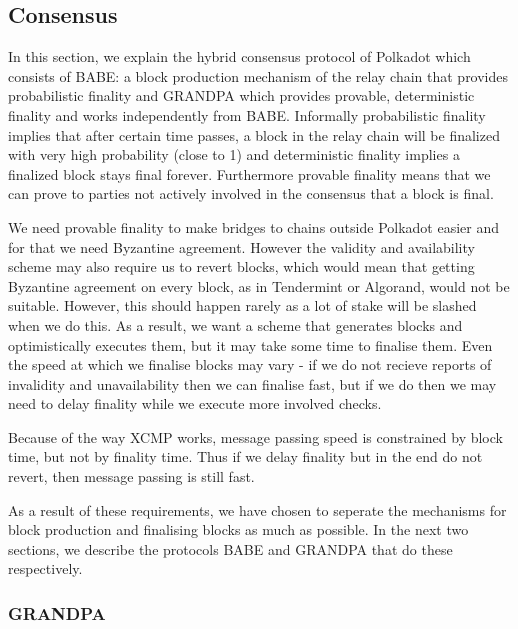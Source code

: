 \subsection{Consensus}\label{sec:consensus}

In this section, we explain the hybrid consensus protocol of Polkadot which consists of BABE: a block production mechanism of the relay chain that provides probabilistic finality and GRANDPA which provides provable, deterministic finality and works independently from BABE.  Informally probabilistic finality implies that after certain time passes, a block in the relay chain will be finalized with very high probability (close to 1) and deterministic finality implies a finalized block stays final forever. Furthermore provable finality means that we can prove to parties not actively involved in the consensus that a block is final.

We need provable finality to make bridges to chains outside Polkadot easier and for that we need Byzantine agreement. However the validity and availability scheme may also require us to revert blocks, which would mean that getting Byzantine agreement on every block, as in Tendermint or Algorand, would not be suitable. However, this should happen rarely as a lot of stake will be slashed when we do this. As a result, we want a scheme that generates blocks and optimistically executes them, but it may take some time to finalise them. 
Even the speed at which we finalise blocks may vary - if we do not recieve reports of invalidity and unavailability then we can finalise fast, but if we do then we may need to delay finality while we execute more involved checks.

Because of the way XCMP works, message passing speed is constrained by block time, but not by finality time. Thus if we delay finality but in the end do not revert, then message passing is still fast.

As a result of these requirements, we have chosen to seperate the mechanisms for block production and finalising blocks as much as possible. In the next two sections, we describe the protocols BABE and GRANDPA that do these respectively.




\subsubsection{GRANDPA} \label{sec:grandpa}


